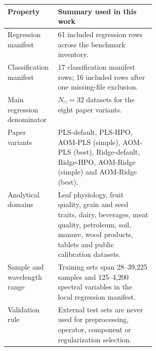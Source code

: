 \begin{tabularx}{\linewidth}{p{0.34\linewidth}X}
\toprule
Property & Summary used in this work \\
\midrule
Regression manifest & 61 included regression rows across the benchmark inventory. \\
Classification manifest & 17 classification manifest rows; 16 included rows after one missing-file exclusion. \\
Main regression denominator & $N_{\cap}=32$ datasets for the eight paper variants. \\
Paper variants & PLS-default, PLS-HPO, AOM-PLS (simple), AOM-PLS (best), Ridge-default, Ridge-HPO, AOM-Ridge (simple) and AOM-Ridge (best). \\
Analytical domains & Leaf physiology, fruit quality, grain and seed traits, dairy, beverages, meat quality, petroleum, soil, manure, wood products, tablets and public calibration datasets. \\
Sample and wavelength range & Training sets span 28--39{,}225 samples and 125--4{,}200 spectral variables in the local regression manifest. \\
Validation rule & External test sets are never used for preprocessing, operator, component or regularization selection. \\
\bottomrule
\end{tabularx}

